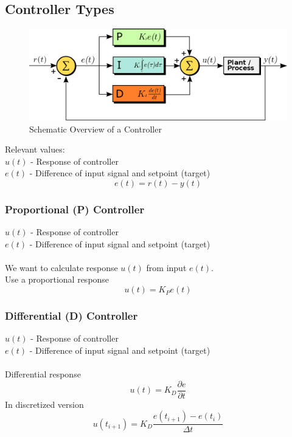 \subsection{Controller Types}
\label{subsec:concepts-controller-types}
\begin{frame}{\insertsubsection}
	\begin{figure}
		\centering
		\includegraphics[width=\textwidth]{media/PID_en}
		\caption{Schematic Overview of a Controller~\cite{wikiPID2011}}
	\end{figure}
	Relevant values:\\
	$u(t)$ - Response of controller\\
	$e(t)$ - Difference of input signal and setpoint (target)
	\begin{equation}
		e(t) = r(t) - y(t)
	\end{equation}
\end{frame}
%
%
\subsubsection{Proportional (P) Controller}
\label{subsec:concepts-controller-types-p-controller}
\begin{frame}{\insertsubsubsection}
	$u(t)$ - Response of controller\\
	$e(t)$ - Difference of input signal and setpoint (target)\\\\
	We want to calculate response $u(t)$ from input $e(t)$.\\
	Use a proportional response
	\begin{equation}
		u(t) = K_P e(t)
	\end{equation}
\end{frame}
%
%
\subsubsection{Differential (D) Controller}
\label{subsec:concepts-controller-types-d-controller}
\begin{frame}{\insertsubsubsection}
	$u(t)$ - Response of controller\\
	$e(t)$ - Difference of input signal and setpoint (target)\\\\
	Differential response
	\begin{equation}
		u(t) = K_D \frac{\partial e}{\partial t}
	\end{equation}
	In discretized version
	\begin{equation}
		u(t_{i+1}) = K_D \frac{e(t_{i+1})- e(t_i)}{\Delta t}
	\end{equation}
\end{frame}
%
%
